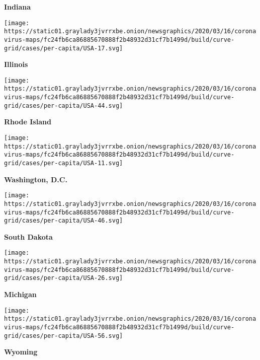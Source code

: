 \textbf{Indiana}

\href{https://www.nytimes3xbfgragh.onion/interactive/2020/us/illinois-coronavirus-cases.html}{}

\texttt{[image: https://static01.graylady3jvrrxbe.onion/newsgraphics/2020/03/16/coronavirus-maps/fc24fb6ca86885670888f2b48932d31cf7b1499d/build/curve-grid/cases/per-capita/USA-17.svg]}

\textbf{Illinois}

\href{https://www.nytimes3xbfgragh.onion/interactive/2020/us/rhode-island-coronavirus-cases.html}{}

\texttt{[image: https://static01.graylady3jvrrxbe.onion/newsgraphics/2020/03/16/coronavirus-maps/fc24fb6ca86885670888f2b48932d31cf7b1499d/build/curve-grid/cases/per-capita/USA-44.svg]}

\textbf{Rhode Island}

\href{https://www.nytimes3xbfgragh.onion/interactive/2020/us/washington-dc-coronavirus-cases.html}{}

\texttt{[image: https://static01.graylady3jvrrxbe.onion/newsgraphics/2020/03/16/coronavirus-maps/fc24fb6ca86885670888f2b48932d31cf7b1499d/build/curve-grid/cases/per-capita/USA-11.svg]}

\textbf{Washington, D.C.}

\href{https://www.nytimes3xbfgragh.onion/interactive/2020/us/south-dakota-coronavirus-cases.html}{}

\texttt{[image: https://static01.graylady3jvrrxbe.onion/newsgraphics/2020/03/16/coronavirus-maps/fc24fb6ca86885670888f2b48932d31cf7b1499d/build/curve-grid/cases/per-capita/USA-46.svg]}

\textbf{South Dakota}

\href{https://www.nytimes3xbfgragh.onion/interactive/2020/us/michigan-coronavirus-cases.html}{}

\texttt{[image: https://static01.graylady3jvrrxbe.onion/newsgraphics/2020/03/16/coronavirus-maps/fc24fb6ca86885670888f2b48932d31cf7b1499d/build/curve-grid/cases/per-capita/USA-26.svg]}

\textbf{Michigan}

\href{https://www.nytimes3xbfgragh.onion/interactive/2020/us/wyoming-coronavirus-cases.html}{}

\texttt{[image: https://static01.graylady3jvrrxbe.onion/newsgraphics/2020/03/16/coronavirus-maps/fc24fb6ca86885670888f2b48932d31cf7b1499d/build/curve-grid/cases/per-capita/USA-56.svg]}

\textbf{Wyoming}

